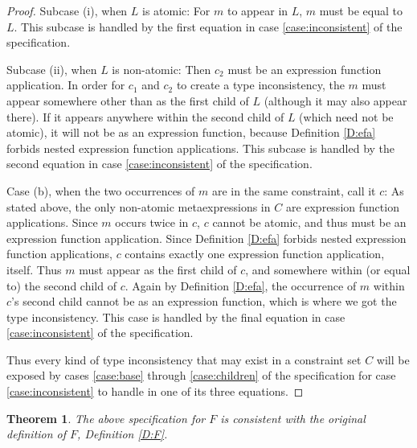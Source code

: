 \documentclass{article}
\newtheorem{thm}{Theorem}
\begin{document}
\begin{proof}
Subcase (i), when $L$ is atomic:  For $m$ to appear in $L$, $m$ must be equal to $L$.  This subcase is handled by the first equation in case \ref{case:inconsistent} of the specification.

Subcase (ii), when $L$ is non-atomic:  Then $c_2$ must be an expression function application.  In order for $c_1$ and $c_2$ to create a type inconsistency, the $m$ must appear somewhere other than as the first child of $L$ (although it may also appear there).  If it appears anywhere within the second child of $L$ (which need not be atomic), it will not be as an expression function, because Definition \ref{D:efa} forbids nested expression function applications.  This subcase is handled by the second equation in case \ref{case:inconsistent} of the specification.

Case (b), when the two occurrences of $m$ are in the same constraint, call it $c$:  As stated above, the only non-atomic metaexpressions in $C$ are expression function applications.  Since $m$ occurs twice in $c$, $c$ cannot be atomic, and thus must be an expression function application.  Since Definition \ref{D:efa} forbids nested expression function applications, $c$ contains exactly one expression function application, itself.  Thus $m$ must appear as the first child of $c$, and somewhere within (or equal to) the second child of $c$.  Again by Definition \ref{D:efa}, the occurrence of $m$ within $c$'s second child cannot be as an expression function, which is where we got the type inconsistency.  This case is handled by the final equation in case \ref{case:inconsistent} of the specification.

Thus every kind of type inconsistency that may exist in a constraint set $C$ will be exposed by cases \ref{case:base} through \ref{case:children} of the specification for case \ref{case:inconsistent} to handle in one of its three equations.
\end{proof}

\begin{thm}\label{T:main}
The above specification for $F$ is consistent with the original definition of $F$, Definition \ref{D:F}.
\end{thm}
\end{document}
